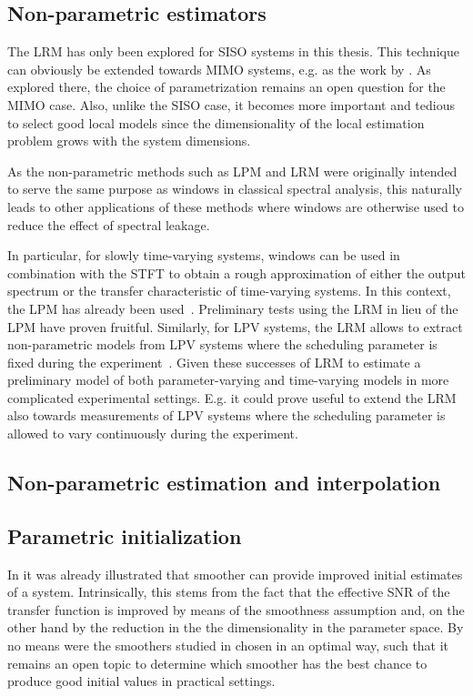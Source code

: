   \subsection{Non-parametric estimators}
    The \gls{LRM} has only been explored for \gls{SISO} systems in this thesis.
    This technique can obviously be extended towards \gls{MIMO} systems, e.g. as the work by \citet{vanRietschoten2015MSc}.
    As explored there, the choice of parametrization remains an open question for the \gls{MIMO} case.
    Also, unlike the \gls{SISO} case, it becomes more important and tedious to select good local models since the dimensionality of the local estimation problem grows with the system dimensions.

    As the non-parametric methods such as \gls{LPM} and \gls{LRM} were originally intended to serve the same purpose as windows in classical spectral analysis, this naturally leads to other applications of these methods where windows are otherwise used to reduce the effect of spectral leakage.

    In particular, for slowly time-varying systems, windows can be used in combination with the \gls{STFT} to obtain a rough approximation of either the output spectrum or the transfer characteristic of time-varying systems.
    In this context, the \gls{LPM} has already been used~\citep{Lataire2012}.
    Preliminary tests using the \gls{LRM} in lieu of the \gls{LPM} have proven fruitful.
    Similarly, for \gls{LPV} systems, the \gls{LRM} allows to extract non-parametric models from \gls{LPV} systems where the scheduling parameter is fixed during the experiment~\citep[Chapter 4]{vanderMaas2016PhD}.
    Given these successes of \gls{LRM} to estimate a preliminary model of both parameter-varying and time-varying models in more complicated experimental settings.
    E.g. it could prove useful to extend the \gls{LRM} also towards measurements of \gls{LPV} systems where the scheduling parameter is allowed to vary continuously during the experiment.

  \subsection{Non-parametric estimation and interpolation}

  \subsection{Parametric initialization}
  In  it was already illustrated that smoother can provide improved initial estimates of a system. 
  Intrinsically, this stems from the fact that the effective \gls{SNR} of the transfer function is improved by means of the smoothness assumption and, on the other hand by the reduction in the the dimensionality in the parameter space.
  By no means were the  smoothers studied in  chosen in an optimal way, such that it remains an open topic to determine which smoother has the best chance to produce good initial values in practical settings.


